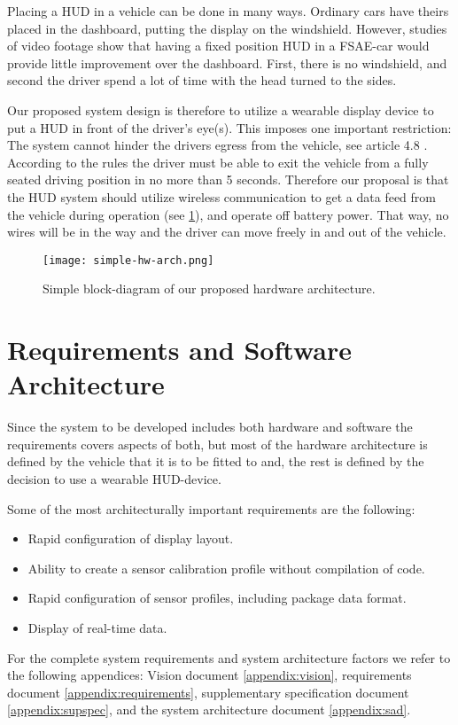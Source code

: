 \label{results:wearableHud}
Placing a HUD in a vehicle can be done in many ways. Ordinary cars have theirs
placed in the dashboard, putting the display on the windshield. However,
studies of video footage show that having a fixed position HUD in a FSAE-car
would provide little improvement over the dashboard. First, there is no windshield,
and second the driver spend a lot of time with the head turned to the sides.

Our proposed system design is therefore to utilize a wearable display 
device to put a HUD in front of the driver's eye(s). This imposes
one important restriction: The system cannot hinder the drivers egress from
the vehicle, see article 4.8 \cite{fsae:2014rules}. According to the rules the
driver must be able to exit the vehicle from a fully seated driving position in
no more than 5 seconds. Therefore our proposal is that the HUD system should
utilize wireless communication to get a data feed from the vehicle during operation (see \ref{fig:simple-hw}), and operate off battery power.
That way, no wires will be in the way and the driver can move freely in and out
of the vehicle. 
\begin{figure}[!htbp]
	\texttt{[image: simple-hw-arch.png]}
	\caption{Simple block-diagram of our proposed hardware architecture.}
	\label{fig:simple-hw}
\end{figure}

\section{Requirements and Software Architecture}
Since the system to be developed includes both hardware and software the
requirements covers aspects of both, but most of the hardware architecture is
defined by the vehicle that it is to be fitted to and, the rest is defined by
the decision to use a wearable HUD-device.

Some of the most architecturally important requirements are the following:
\begin{itemize}
\item Rapid configuration of display layout.
\item Ability to create a sensor calibration profile without compilation of
code.
\item Rapid configuration of sensor profiles, including package data format. 
\item Display of real-time data.
\end{itemize}
For the complete system requirements and system architecture factors we refer to the following appendices: Vision document \vref{appendix:vision},
requirements document \vref{appendix:requirements}, supplementary specification
document
\vref{appendix:supspec}, and the system architecture document \vref{appendix:sad}.

